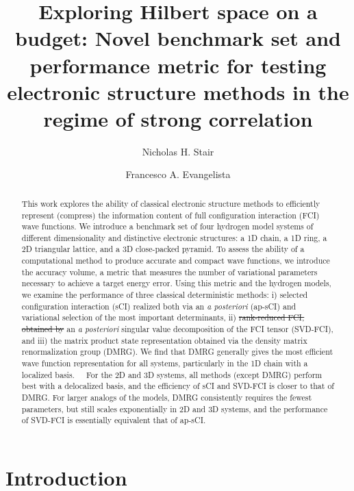 \documentclass[aip,jcp,amsmath,amssymb, preprint]{revtex4-1}
\newcommand{\addnew}[1]{\colorbox{goodorange}{\textcolor{white}{\footnotesize  \fontfamily{phv}\selectfont +}}
\textcolor{goodorange}{{#1}}\xspace
}
\newcommand{\remove}[1]{
\colorbox{goodred}{\textcolor{white}{\footnotesize  \fontfamily{phv}\selectfont \textminus\vphantom{c}}}
\textcolor{goodred}{\sout{#1}}\xspace
}
\begin{document}
\title{Exploring Hilbert space on a budget: Novel benchmark set and performance metric for testing electronic structure methods in the regime of strong correlation}
\author{Nicholas H. Stair}
\author{Francesco A. Evangelista}

\begin{abstract}
This work explores the ability of classical electronic structure methods to efficiently represent (compress) the information content of full configuration interaction (FCI) wave functions.
We introduce a benchmark set of four hydrogen model systems of different dimensionality and distinctive electronic structures: a 1D chain, a 1D ring, a 2D triangular lattice, and a 3D close-packed pyramid.
To assess the ability of a computational method to produce accurate and compact wave functions, we introduce the accuracy volume, a metric that measures the number of variational parameters necessary to achieve a target energy error.
Using this metric and the hydrogen models, we examine the performance of three classical deterministic methods: i) selected configuration interaction (sCI) realized both via an \textit{a posteriori} (ap-sCI) and variational selection of the most important determinants, ii) \remove{rank-reduced FCI, obtained by} an \textit{a posteriori} singular value decomposition of the FCI tensor (SVD-FCI), and iii) the matrix product state representation obtained via the density matrix renormalization group (DMRG).
We find that DMRG generally gives the most efficient wave function representation for all systems, particularly in the 1D chain with a localized basis.
 \addnew{For the 2D and 3D systems, all methods (except DMRG) perform best with a delocalized basis, and the efficiency of sCI and SVD-FCI is closer to that of DMRG.
For larger analogs of the models, DMRG consistently requires the fewest parameters, but still scales exponentially in 2D and 3D systems, and the performance of SVD-FCI is essentially equivalent that of ap-sCI.}
\end{abstract}

\linenumbersep=24pt

\maketitle

\section{\label{sec:intro}Introduction}
\end{document}
